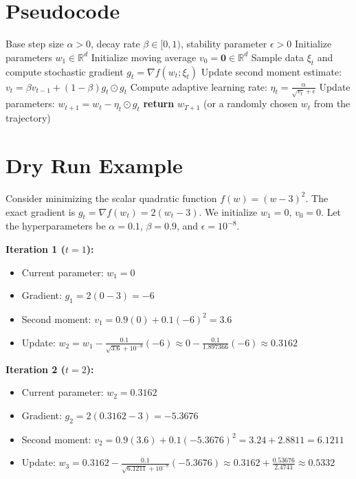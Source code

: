 \documentclass[11pt]{article}
\begin{document}
\section*{Pseudocode}
\begin{algorithm}[H]
\caption{RMSProp Optimization Algorithm}
\begin{algorithmic}[1]
\Require Base step size $\alpha > 0$, decay rate $\beta \in [0, 1)$, stability parameter $\epsilon > 0$
\State Initialize parameters $w_1 \in \mathbb{R}^d$
\State Initialize moving average $v_0 = \mathbf{0} \in \mathbb{R}^d$
    \State Sample data $\xi_t$ and compute stochastic gradient $g_t = \nabla f(w_t; \xi_t)$
    \State Update second moment estimate: $v_t = \beta v_{t-1} + (1 - \beta) g_t \odot g_t$
    \State Compute adaptive learning rate: $\eta_t = \frac{\alpha}{\sqrt{v_t} + \epsilon}$ 
    \State Update parameters: $w_{t+1} = w_t - \eta_t \odot g_t$
\EndFor
\State \textbf{return} $w_{T+1}$ (or a randomly chosen $w_t$ from the trajectory)
\end{algorithmic}
\end{algorithm}

\section*{Dry Run Example}
Consider minimizing the scalar quadratic function $f(w) = (w - 3)^2$. The exact gradient is $g_t = \nabla f(w_t) = 2(w_t - 3)$. 
We initialize $w_1 = 0$, $v_0 = 0$. Let the hyperparameters be $\alpha = 0.1$, $\beta = 0.9$, and $\epsilon = 10^{-8}$.

\textbf{Iteration 1 ($t=1$):}
\begin{itemize}
    \item Current parameter: $w_1 = 0$
    \item Gradient: $g_1 = 2(0 - 3) = -6$
    \item Second moment: $v_1 = 0.9(0) + 0.1(-6)^2 = 3.6$
    \item Update: $w_2 = w_1 - \frac{0.1}{\sqrt{3.6} + 10^{-8}} (-6) \approx 0 - \frac{0.1}{1.897366} (-6) \approx 0.3162$
\end{itemize}

\textbf{Iteration 2 ($t=2$):}
\begin{itemize}
    \item Current parameter: $w_2 = 0.3162$
    \item Gradient: $g_2 = 2(0.3162 - 3) = -5.3676$
    \item Second moment: $v_2 = 0.9(3.6) + 0.1(-5.3676)^2 = 3.24 + 2.8811 = 6.1211$
    \item Update: $w_3 = 0.3162 - \frac{0.1}{\sqrt{6.1211} + 10^{-8}} (-5.3676) \approx 0.3162 + \frac{0.53676}{2.4741} \approx 0.5332$
\end{itemize}
\end{document}
